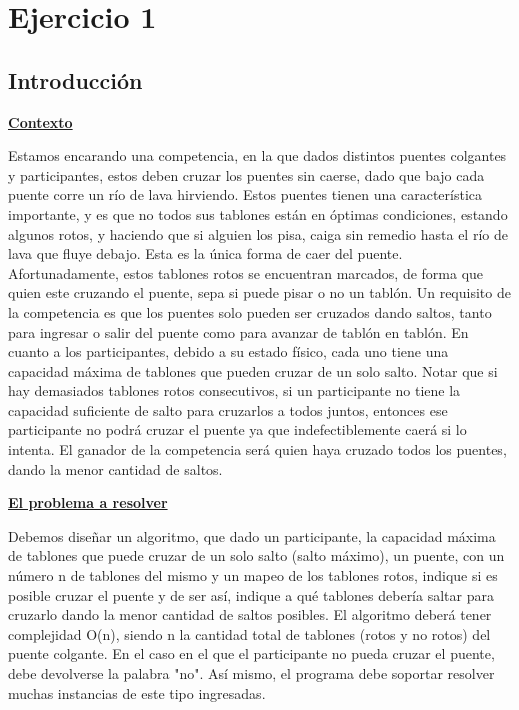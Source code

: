 \documentclass[10pt,a4paper]{article}
\begin{document}
\setlength{\parindent}{8pt} %

\section{Ejercicio 1}

\subsection{Introducción}
\noindent \underline{\textbf{Contexto}}

Estamos encarando una competencia, en la que dados distintos puentes colgantes y participantes, estos deben cruzar los puentes sin caerse, dado que bajo cada puente corre un río de lava hirviendo.
Estos puentes tienen una característica importante, y es que no todos sus tablones están en óptimas condiciones, estando algunos rotos, y haciendo que si alguien los pisa, caiga sin remedio hasta el río de lava que fluye debajo. Esta es la única forma de caer del puente. Afortunadamente, estos tablones rotos se encuentran marcados, de forma que quien este cruzando el puente, sepa si puede pisar o no un tablón.
Un requisito de la competencia es que los puentes solo pueden ser cruzados dando saltos, tanto para ingresar o salir del puente como para avanzar de tablón en tablón.
En cuanto a los participantes, debido a su estado físico, cada uno tiene una capacidad máxima de tablones que pueden cruzar de un solo salto.
Notar que si hay demasiados tablones rotos consecutivos, si un participante no tiene la capacidad suficiente de salto para cruzarlos a todos juntos, entonces ese participante no podrá cruzar el puente ya que indefectiblemente caerá si lo intenta.
El ganador de la competencia será quien haya cruzado todos los puentes, dando la menor cantidad de saltos.

\noindent \underline{\textbf{El problema a resolver}}

Debemos diseñar un algoritmo, que dado un participante, la capacidad máxima de tablones que puede cruzar de un solo salto (salto máximo), un puente, con un número n de tablones del mismo y un mapeo de los tablones rotos, indique si es posible cruzar el puente y de ser así, indique a qué tablones debería saltar para cruzarlo dando la menor cantidad de saltos posibles. El algoritmo deberá tener complejidad O(n), siendo n la cantidad total de tablones (rotos y no rotos) del puente colgante.
En el caso en el que el participante no pueda cruzar el puente, debe devolverse la palabra "no".
Así mismo, el programa debe soportar resolver muchas instancias de este tipo ingresadas.
\end{document}
